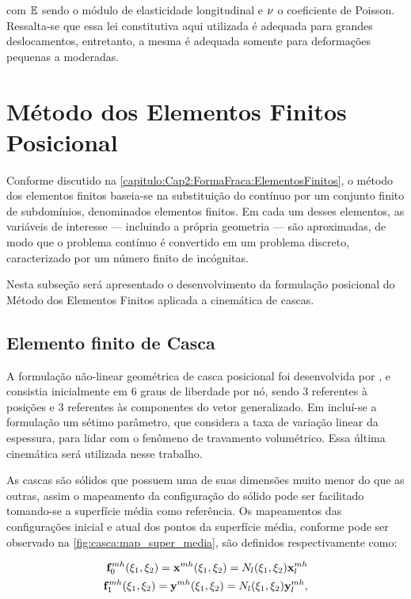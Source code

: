 \noindent com $\mathbb{E}$ sendo o módulo de elasticidade longitudinal e $\nu$ o coeficiente de Poisson. Ressalta-se que essa lei constitutiva aqui utilizada é adequada para grandes deslocamentos, entretanto, a mesma é adequada somente para deformações pequenas a moderadas.

\section{Método dos Elementos Finitos Posicional}

Conforme discutido na \autoref{capitulo:Cap2:FormaFraca:ElementosFinitos}, o método dos elementos finitos baseia-se na substituição do contínuo por um conjunto finito de subdomínios, denominados elementos finitos. Em cada um desses elementos, as variáveis de interesse — incluindo a própria geometria — são aproximadas, de modo que o problema contínuo é convertido em um problema discreto, caracterizado por um número finito de incógnitas.

Nesta subseção será apresentado o desenvolvimento da formulação posicional do Método dos Elementos Finitos aplicada a cinemática de cascas.

\subsection{Elemento finito de Casca} \label{capitulo:Cap4:Mef:Casca}

A formulação não-linear geométrica de casca posicional foi desenvolvida por , e consistia inicialmente em 6 graus de liberdade por nó, sendo 3 referentes à posições e 3 referentes às componentes do vetor generalizado. Em  incluí-se a formulação um sétimo parâmetro, que considera a taxa de variação linear da espessura, para lidar com o fenômeno de travamento volumétrico. Essa última cinemática será utilizada nesse trabalho.

As cascas são sólidos que possuem uma de suas dimensões muito menor do que as outras, assim o mapeamento da configuração do sólido pode ser facilitado tomando-se a superfície média como referência. Os mapeamentos das configurações inicial e atual dos pontos da superfície média, conforme pode ser observado na \autoref{fig:casca:map_super_media}, são definidos respectivamente como:

\begin{align}
\mathbf{f}^{mh}_{0}(\xi_{1},\xi_{2}) = \mathbf{x}^{mh}(\xi_{1},\xi_{2}) = N_{l} (\xi_{1},\xi_{2}) \mathbf{x}_{l}^{mh}\label{eq:casca_Lposition_m}\\
\mathbf{f}^{mh}_{1}(\xi_{1},\xi_{2}) = \mathbf{y}^{mh}(\xi_{1},\xi_{2}) = N_{l} (\xi_{1},\xi_{2}) \mathbf{y}_{l}^{mh}, \label{eq:casca_Eposition_m}
\end{align}

